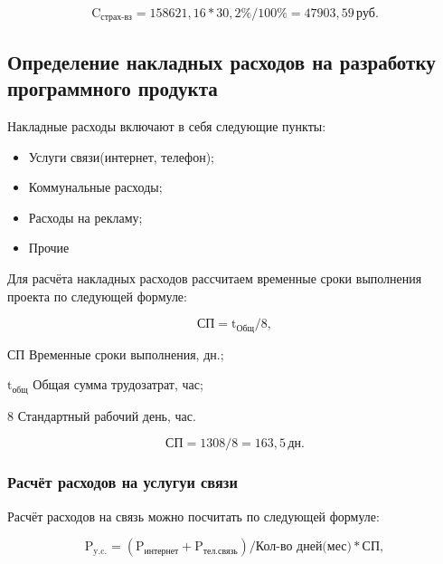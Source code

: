\begin{equation*}
    \text{C}_\text{страх-вз} = 158621,16 * 30,2\% / 100\% = 47903,59 \, \text{руб}.
\end{equation*}

\tocless\subsection{Определение накладных расходов на разработку программного продукта}

Накладные расходы включают в себя следующие пункты:

\begin{itemize}
    \item Услуги связи(интернет, телефон);
    \item Коммунальные расходы;
    \item Расходы на рекламу;
    \item Прочие
\end{itemize}

Для расчёта накладных расходов рассчитаем временные сроки выполнения проекта по следующей
формуле:

\begin{equation}
    \text{СП} = \text{t}_\text{Общ} / 8,
\end{equation}

\begin{eqexpl}[5ex]
    \item{СП} Временные сроки выполнения, дн.;
    \item{$\text{t}_\text{общ}$} Общая сумма трудозатрат, час;
    \item{8} Стандартный рабочий день, час.
\end{eqexpl}

\begin{equation*}
    \text{СП} = 1308 / 8 = 163,5 \, \text{дн}.
\end{equation*}

\subsubsection{Расчёт расходов на услугуи связи}

Расчёт расходов на связь можно посчитать по следующей формуле:

\begin{equation}
    \text{P}_\text{y.c.} = (\text{P}_\text{интернет} + \text{P}_\text{тел.связь}) / \text{Кол-во дней(мес)} * \text{СП},
\end{equation}

